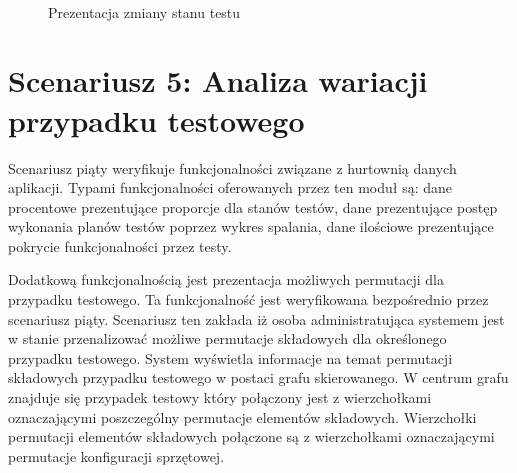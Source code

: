 \begin{figure}[h]
\centering
{}\\

\caption{Prezentacja zmiany stanu testu}
\label{fig:zmianyStanu}
\end{figure}


\section{Scenariusz 5: Analiza wariacji przypadku testowego}

Scenariusz piąty weryfikuje funkcjonalności związane z hurtownią danych aplikacji. Typami funkcjonalności oferowanych przez ten moduł są: dane procentowe prezentujące proporcje dla stanów testów, dane prezentujące postęp wykonania planów testów poprzez wykres spalania, dane ilościowe prezentujące pokrycie funkcjonalności przez testy.

Dodatkową funkcjonalnością jest prezentacja możliwych permutacji dla przypadku testowego. Ta funkcjonalność jest weryfikowana bezpośrednio przez scenariusz piąty. Scenariusz ten zakłada iż osoba administratująca systemem jest w stanie przenalizować możliwe permutacje składowych dla określonego przypadku testowego. System wyświetla informacje na temat permutacji składowych przypadku testowego w postaci grafu skierowanego. W centrum grafu znajduje się przypadek testowy który połączony jest z wierzchołkami oznaczającymi poszczególny permutacje elementów składowych. Wierzchołki permutacji elementów składowych połączone są z wierzchołkami oznaczającymi permutacje konfiguracji sprzętowej.

